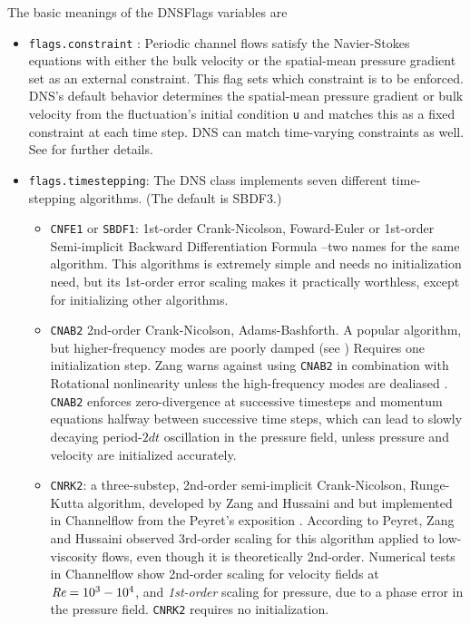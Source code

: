 \documentclass{article}[12pt]
\begin{document}
\noindent
The basic meanings of the DNSFlags variables are
\begin{itemize}
\item {\tt flags.constraint} : Periodic channel flows satisfy the
Navier-Stokes equations with either the bulk velocity or the
spatial-mean pressure gradient set as an external constraint. This
flag sets which constraint is to be enforced. DNS's default
behavior determines the spatial-mean pressure gradient or bulk
velocity from the fluctuation's initial condition {\tt u} and matches
this as a fixed constraint at each time step. DNS can match
time-varying constraints as well. See  for further
details.
\item {\tt flags.timestepping}: The DNS class implements seven different
time-stepping algorithms. (The default is SBDF3.)
\begin{itemize}
  \item {\tt CNFE1} or {\tt SBDF1}: 1st-order Crank-Nicolson, Foward-Euler or
  1st-order Semi-implicit Backward Differentiation Formula --two names for
  the same algorithm. This algorithms is extremely simple and needs no
  initialization need, but its 1st-order error scaling makes it practically
  worthless, except for initializing other algorithms.
  \item {\tt CNAB2} 2nd-order Crank-Nicolson, Adams-Bashforth. A popular
  algorithm, but higher-frequency modes are poorly damped (see \cite{Ascher95})
  Requires one initialization step. Zang warns against using {\tt CNAB2}
  in combination with Rotational nonlinearity unless the high-frequency modes
  are dealiased \cite{Zang95}. {\tt CNAB2} enforces zero-divergence at
  successive timesteps and momentum equations halfway between successive
  time steps, which can lead to slowly decaying period-$2dt$ oscillation
  in the pressure field, unless pressure and velocity are initialized
  accurately.
  \item {\tt CNRK2}: a three-substep, 2nd-order semi-implicit Crank-Nicolson,
  Runge-Kutta algorithm, developed by Zang and Hussaini \cite{Zang95} and
  but implemented in Channelflow from the Peyret's exposition \cite{Peyret02}.
  According to Peyret, Zang and Hussaini observed 3rd-order scaling for
  this algorithm applied to low-viscosity flows, even though it is
  theoretically 2nd-order. Numerical tests in Channelflow show 2nd-order
  scaling for velocity fields at $\mbox{{\it Re}} = 10^3 - 10^4$, and {\em 1st-order}
  scaling for pressure, due to a phase error in the pressure field. {\tt CNRK2}
  requires no initialization.

\end{itemize}
\end{itemize}
\end{document}
